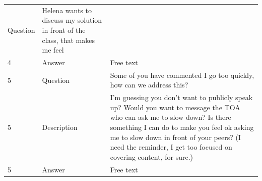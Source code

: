 \documentclass[paper=a4,justified,a4paper]{tufte-handout}
\begin{document}
\begin{longtable}[]{@{}lll@{}}
\begin{minipage}[t]{0.14\columnwidth}
Question\strut
\end{minipage} & \begin{minipage}[t]{0.68\columnwidth}\raggedright
Helena wants to discuss my solution in front of the class, that makes me
feel\strut
\end{minipage}\tabularnewline
\begin{minipage}[t]{0.09\columnwidth}\raggedright
4\strut
\end{minipage} & \begin{minipage}[t]{0.14\columnwidth}\raggedright
Answer\strut
\end{minipage} & \begin{minipage}[t]{0.68\columnwidth}\raggedright
Free text\strut
\end{minipage}\tabularnewline
\begin{minipage}[t]{0.09\columnwidth}\raggedright
5\strut
\end{minipage} & \begin{minipage}[t]{0.14\columnwidth}\raggedright
Question\strut
\end{minipage} & \begin{minipage}[t]{0.68\columnwidth}\raggedright
Some of you have commented I go too quickly, how can we address
this?\strut
\end{minipage}\tabularnewline
\begin{minipage}[t]{0.09\columnwidth}\raggedright
5\strut
\end{minipage} & \begin{minipage}[t]{0.14\columnwidth}\raggedright
Description\strut
\end{minipage} & \begin{minipage}[t]{0.68\columnwidth}\raggedright
I'm guessing you don't want to publicly speak up? Would you want to
message the TOA who can ask me to slow down? Is there something I can do
to make you feel ok asking me to slow down in front of your peers? (I
need the reminder, I get too focused on covering content, for
sure.)\strut
\end{minipage}\tabularnewline
\begin{minipage}[t]{0.09\columnwidth}\raggedright
5\strut
\end{minipage} & \begin{minipage}[t]{0.14\columnwidth}\raggedright
Answer\strut
\end{minipage} & \begin{minipage}[t]{0.68\columnwidth}\raggedright
Free text\strut
\end{minipage}\tabularnewline

\end{longtable}
\end{document}

